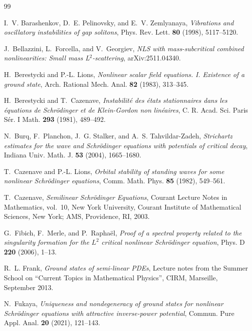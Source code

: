 \documentclass[12pt, a4paper, reqno]{amsart}
\numberwithin{equation}{section}
\theoremstyle{definition}
\theoremstyle{remark}
\begin{document}
\begin{thebibliography}{99}

I.~V. Barashenkov, D.~E. Pelinovsky, and E.~V. Zemlyanaya,
\emph{Vibrations and oscillatory instabilities of gap solitons},
Phys. Rev. Lett. \textbf{80} (1998), 5117--5120.

J.~Bellazzini, L.~Forcella, and V.~Georgiev,
\emph{{{NLS}} with mass-subcritical combined nonlinearities: Small mass
  {{L}}{$^2$}-scattering},
arXiv:2511.04340.

H.~Berestycki and P.-L. Lions,
\emph{Nonlinear scalar field equations. {{I}}. {{Existence}} of a ground
  state},
Arch. Rational Mech. Anal. \textbf{82} (1983), 313--345.

H.~Berestycki and T.~Cazenave,
\emph{Instabilit\'e des \'etats stationnaires dans les \'equations de
  {{Schr\"odinger}} et de {{Klein-Gordon}} non lin\'eaires},
C. R. Acad. Sci. Paris S\'er. I Math. \textbf{293} (1981), 489--492.

N.~Burq, F.~Planchon, J.~G. Stalker, and A.~S. {Tahvildar-Zadeh},
\emph{Strichartz estimates for the wave and {{Schr\"odinger}} equations with
  potentials of critical decay},
Indiana Univ. Math. J. \textbf{53} (2004), 1665--1680.

T.~Cazenave and P.-L. Lions,
\emph{Orbital stability of standing waves for some nonlinear {{Schr\"odinger}}
  equations},
Comm. Math. Phys. \textbf{85} (1982), 549--561.

T.~Cazenave,
\emph{Semilinear {{Schr\"odinger Equations}}},
Courant {{Lecture Notes}} in {{Mathematics}}, vol.~10, New York University,
  Courant Institute of Mathematical Sciences, New York; AMS, Providence, RI,
  2003.

G.~Fibich, F.~Merle, and P.~Rapha{\"e}l,
\emph{Proof of a spectral property related to the singularity formation for the
  {$L^2$} critical nonlinear {S}chr\"{o}dinger equation},
Phys. D \textbf{220} (2006), 1--13.

R.~L. Frank,
\emph{Ground states of semi-linear {{PDEs}}},
Lecture notes from the Summer School on ``Current Topics in Mathematical
  Physics'', CIRM, Marseille, September 2013.

N.~Fukaya,
\emph{Uniqueness and nondegeneracy of ground states for nonlinear
  {{Schr\"odinger}} equations with attractive inverse-power potential},
Commun. Pure Appl. Anal. \textbf{20} (2021), 121--143.


\end{thebibliography}
\end{document}
